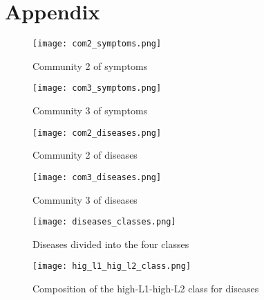\section{Appendix}


\begin{figure}[H]
	\centering
	\texttt{[image: com2\_symptoms.png]}
	\caption{Community 2 of symptoms}\label{fig:com2_symptoms}
\end{figure}
\noindent
\begin{figure}[H]
	\centering
	\texttt{[image: com3\_symptoms.png]}
	\caption{Community 3 of symptoms}\label{fig:com3_symptoms}
\end{figure}
\noindent


\begin{figure}[H]
	\centering
	\texttt{[image: com2\_diseases.png]}
	\caption{Community 2 of diseases}\label{fig:com2_diseases}
\end{figure}
\noindent
\begin{figure}[H]
	\centering
	\texttt{[image: com3\_diseases.png]}
	\caption{Community 3 of diseases}\label{fig:com3_diseases}
\end{figure}
\noindent


\begin{figure}[H]
	\centering
	\texttt{[image: diseases\_classes.png]}
	\caption{Diseases divided into the four classes}\label{fig:diseases_classes}
\end{figure}

\begin{figure*}[!t]
	\centering
	\texttt{[image: hig\_l1\_hig\_l2\_class.png]}
	\caption{Composition of the high-L1-high-L2 class for diseases}\label{fig:high_l1_high_l2_class}
\end{figure*}